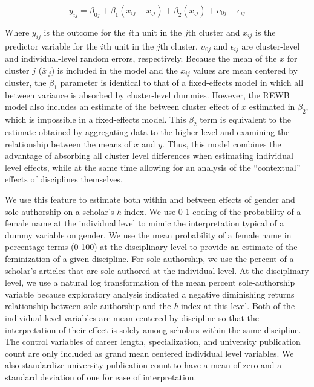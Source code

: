\documentclass[
  10pt,
  letterpaper,
]{article}
\begin{document}
\[y_{ij}=\beta_{0j}+\beta_1(x_{ij}-\bar{x}_{.j})+\beta_2(\bar{x}_{.j})+\upsilon_{0j}+\epsilon_{ij}\]

Where \(y_{ij}\) is the outcome for the \(i\)th unit in the \(j\)th
cluster and \(x_{ij}\) is the predictor variable for the \(i\)th unit in
the \(j\)th cluster. \(\upsilon_{0j}\) and \(\epsilon_{ij}\) are
cluster-level and individual-level random errors, respectively. Because
the mean of the \(x\) for cluster \(j\) (\(\bar{x}_{.j}\)) is included
in the model and the \(x_{ij}\) values are mean centered by cluster, the
\(\beta_1\) parameter is identical to that of a fixed-effects model in
which all between variance is absorbed by cluster-level dummies.
However, the REWB model also includes an estimate of the between cluster
effect of \(x\) estimated in \(\beta_2\), which is impossible in a
fixed-effects model. This \(\beta_2\) term is equivalent to the estimate
obtained by aggregating data to the higher level and examining the
relationship between the means of \(x\) and \(y\). Thus, this model
combines the advantage of absorbing all cluster level differences when
estimating individual level effects, while at the same time allowing for
an analysis of the ``contextual'' effects of disciplines themselves.

We use this feature to estimate both within and between effects of
gender and sole authorship on a scholar's \emph{h}-index. We use 0-1
coding of the probability of a female name at the individual level to
mimic the interpretation typical of a dummy variable on gender. We use
the mean probability of a female name in percentage terms (0-100) at the
disciplinary level to provide an estimate of the feminization of a given
discipline. For sole authorship, we use the percent of a scholar's
articles that are sole-authored at the individual level. At the
disciplinary level, we use a natural log transformation of the mean
percent sole-authorship variable because exploratory analysis indicated
a negative diminishing returns relationship between sole-authorship and
the \emph{h}-index at this level. Both of the individual level variables
are mean centered by discipline so that the interpretation of their
effect is solely among scholars within the same discipline. The control
variables of career length, specialization, and university publication
count are only included as grand mean centered individual level
variables. We also standardize university publication count to have a
mean of zero and a standard deviation of one for ease of interpretation.
\end{document}
